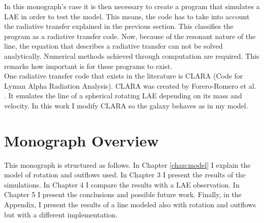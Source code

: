 In this monograph's case it is then necessary to create a program that simulates a LAE in order to test the model. This means, the code has to take into account the radiative transfer explained in the previous section. This classifies the program as a radiative transfer code. Now, because of the resonant nature of the \lya line, the equation that describes a radiative transfer can not be solved analytically. Numerical methods achieved through computation are required. This remarks how important is for these programs to exist. \\

One radiative transfer code that exists in the literature is CLARA (Code for Lyman Alpha Radiation Analysis). CLARA was created by Forero-Romero et al. \cite{Forero12}. It emulates the \lya line of a spherical rotating LAE depending on its mass and velocity. In this work I modify CLARA so the galaxy behaves as in my model. \\


\section{Monograph Overview}
This monograph is structured as follows. In Chapter \ref{chap:model} I explain the model of rotation and outflows used. In Chapter 3 I present the results of the simulations. In Chapter 4 I compare the results with a LAE observation. In Chapter 5 I present the conclusions and possible future work. Finally, in the Appendix, I present the results of a \lya line modeled also with rotation and outflows but with a different implementation. \\



